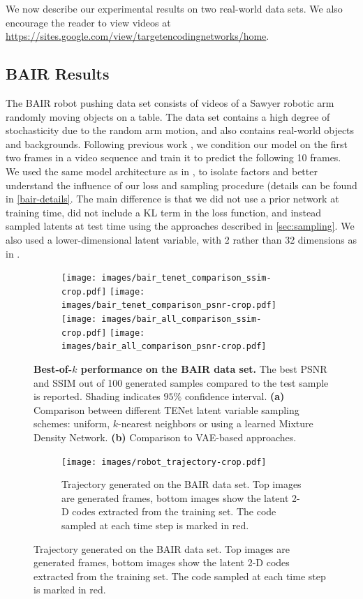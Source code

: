 \documentclass{article}
\newcommand{\modelname}{TENet }
\begin{document}
We now describe our experimental results on two real-world data sets.
We also encourage the reader to view videos at \url{https://sites.google.com/view/targetencodingnetworks/home}.

\subsection{BAIR Results}

The BAIR robot pushing data set \citep{Ebert17} consists of videos of a Sawyer robotic arm randomly moving objects on a table.
The data set contains a high degree of stochasticity due to the random arm motion, and also contains real-world objects and backgrounds.
Following previous work \citep{Babaeizadeh2018, Denton2018}, we condition our model on the first two frames in a video sequence and train it to predict the following 10 frames.
We used the same model architecture as in \citep{Denton2018}, to isolate factors and better understand the influence of our loss and sampling procedure (details can be found in \cref{bair-details}.
The main difference is that we did not use a prior network at training time, did not include a KL term in the loss function, and instead sampled latents at test time using the approaches described in \cref{sec:sampling}.
We also used a lower-dimensional latent variable, with 2 rather than 32 dimensions as in \citep{Denton2018}.

\begin{figure}
  \centering
  \begin{subfigure}[b]{\textwidth}
    \centering
  \texttt{[image: images/bair\_tenet\_comparison\_ssim-crop.pdf]}
  \texttt{[image: images/bair\_tenet\_comparison\_psnr-crop.pdf]}
  \texttt{[image: images/bair\_all\_comparison\_ssim-crop.pdf]}
  \texttt{[image: images/bair\_all\_comparison\_psnr-crop.pdf]}
  \caption{}
  \end{subfigure}
  \caption{
    \textbf{Best-of-$k$ performance on the BAIR data set.}
    The best PSNR and SSIM out of 100 generated samples compared to the test sample is reported.
    Shading indicates $95\%$ confidence interval.
    \textbf{(a)} Comparison between different \modelname latent variable sampling schemes: uniform, $k$-nearest neighbors or using a learned Mixture Density Network.
    \textbf{(b)} Comparison to VAE-based approaches.
  }
  \label{bair}
\end{figure}

\begin{figure}
  \centering
  \begin{subfigure}[b]{\textwidth}
    \centering
  \texttt{[image: images/robot\_trajectory-crop.pdf]}
  \caption{
    Trajectory generated on the BAIR data set.
Top images are generated frames, bottom images show the latent 2-D codes extracted from the training set.
The code sampled at each time step is marked in red.
  }
    \label{robot-trajectory}
  \end{subfigure}
\end{figure}
\end{document}
